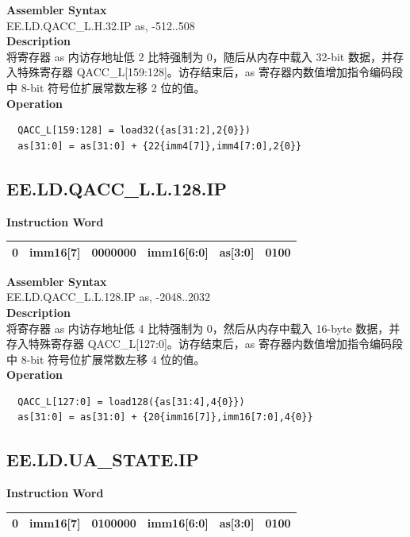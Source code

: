 \textbf{Assembler Syntax} \\
EE.LD.QACC\_L.H.32.IP as, -512..508 \\
\textbf{Description} \\
将寄存器 as 内访存地址低 2 比特强制为 0，随后从内存中载入 32-bit 数据，并存入特殊寄存器 QACC\_L[159:128]。访存结束后，as 寄存器内数值增加指令编码段中 8-bit 符号位扩展常数左移 2 位的值。\\
\textbf{Operation}
\begin{lstlisting}
  QACC_L[159:128] = load32({as[31:2],2{0}})
  as[31:0] = as[31:0] + {22{imm4[7]},imm4[7:0],2{0}}
\end{lstlisting}

\clearpage
\subsection{EE.LD.QACC\_L.L.128.IP}\label{instruction:EELDQACCLL128IP}
\setlength\tabcolsep{6pt}
\textbf{Instruction Word} \\
\begin{tabular}{|c|c|c|c|c|c|}
	\hline
	0 & imm16[7] & 0000000 & imm16[6:0] & as[3:0] & 0100 \\
	\hline
\end{tabular}

\textbf{Assembler Syntax} \\
EE.LD.QACC\_L.L.128.IP as, -2048..2032 \\
\textbf{Description} \\
将寄存器 as 内访存地址低 4 比特强制为 0，然后从内存中载入 16-byte 数据，并存入特殊寄存器 QACC\_L[127:0]。访存结束后，as 寄存器内数值增加指令编码段中 8-bit 符号位扩展常数左移 4 位的值。\\
\textbf{Operation}
\begin{lstlisting}
  QACC_L[127:0] = load128({as[31:4],4{0}})
  as[31:0] = as[31:0] + {20{imm16[7]},imm16[7:0],4{0}}
\end{lstlisting}

\clearpage
\subsection{EE.LD.UA\_STATE.IP}\label{instruction:EELDUASTATEIP}
\setlength\tabcolsep{6pt}
\textbf{Instruction Word} \\
\begin{tabular}{|c|c|c|c|c|c|}
	\hline
	0 & imm16[7] & 0100000 & imm16[6:0] & as[3:0] & 0100 \\
	\hline
\end{tabular}

